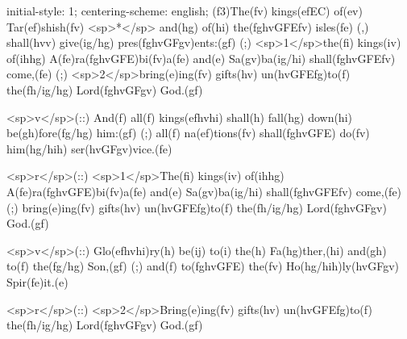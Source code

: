 initial-style: 1;
centering-scheme: english;
(f3)The(fv) kings(efEC) of(ev) Tar(ef)shish(fv) <sp>*</sp> and(hg) of(hi) the(fghvGFEfv) isles(fe) (,) shall(hvv) give(ig/hg) pres(fghvGFgv)ents:(gf) (;) <sp>1</sp>the(fi) kings(iv) of(ihhg) A(fe)ra(fghvGFE)bi(fv)a(fe) and(e) Sa(gv)ba(ig/hi) shall(fghvGFEfv) come,(fe) (;) <sp>2</sp>bring(e)ing(fv) gifts(hv) un(hvGFEfg)to(f) the(fh/ig/hg) Lord(fghvGFgv) God.(gf)

<sp>v</sp>(::) And(f) all(f) kings(efhvhi) shall(h) fall(hg) down(hi) be(gh)fore(fg/hg) him:(gf) (;) all(f) na(ef)tions(fv) shall(fghvGFE) do(fv) him(hg/hih) ser(hvGFgv)vice.(fe)

<sp>r</sp>(::) <sp>1</sp>The(fi) kings(iv) of(ihhg) A(fe)ra(fghvGFE)bi(fv)a(fe) and(e) Sa(gv)ba(ig/hi) shall(fghvGFEfv) come,(fe) (;) bring(e)ing(fv) gifts(hv) un(hvGFEfg)to(f) the(fh/ig/hg) Lord(fghvGFgv) God.(gf)

<sp>v</sp>(::) Glo(efhvhi)ry(h) be(ij) to(i) the(h) Fa(hg)ther,(hi) and(gh) to(f) the(fg/hg) Son,(gf) (;) and(f) to(fghvGFE) the(fv) Ho(hg/hih)ly(hvGFgv) Spir(fe)it.(e)

<sp>r</sp>(::) <sp>2</sp>Bring(e)ing(fv) gifts(hv) un(hvGFEfg)to(f) the(fh/ig/hg) Lord(fghvGFgv) God.(gf)